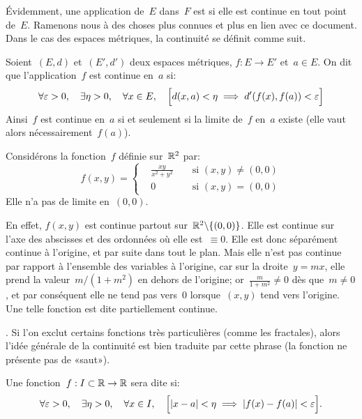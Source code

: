 \medskip
Évidemment, une application de~$E$ dans~$F$ est  si elle est continue en tout point de~$E$.
\medskipvm
Ramenons nous à des choses plus connues et plus en lien avec ce document.
Dans le cas des espaces métriques, la continuité se définit comme suit.

\begin{definition}
Soient~$(E,d)$ et~$(E',d')$ deux espaces métriques, $f: E \to E'$ et~$a \in E$.
On dit que l'application~$f$ est continue en~$a$ si:
\begin{equation}
  \forall \varepsilon > 0, \quad \exists \eta > 0, \quad \forall x \in E, \quad \Bigl[d(x,a)<\eta \implies d'(f(x),f(a))<\varepsilon\Bigr]
\end{equation}
Ainsi~$f$ est continue en~$a$ si et seulement si la limite de~$f$ en~$a$ existe (elle vaut alors nécessairement~$f(a)$).
\end{definition}

\medskip
Considérons la fonction~$f$ définie sur~$\mathbb R^2$ par:
\begin{equation}
  f(x,y)=\left\{\begin{aligned}&\frac{xy}{x^2+y^2}&&\text{ si } (x,y)\neq(0,0) \\
&0&&\text{ si } (x,y)=(0,0) \end{aligned}\right.
\end{equation}
Elle n'a pas de limite en~$(0,0)$.

\small
En effet, $f(x,y)$ est continue partout sur~$\mathbb R^2\backslash\{(0,0)\}$. Elle est continue sur l'axe des abscisses et des ordonnées où elle est~$\equiv0$. Elle est donc séparément continue à l'origine, et par suite dans tout le plan. Mais elle n'est pas continue par rapport à l'ensemble des variables à l'origine, car sur la droite~$y=mx$, elle prend la valeur~$m/(1+m^2)$ en dehors de l'origine; or~$\frac{m}{1+m^2}\ne0$ dès que~$m\ne0$, et par conséquent elle ne tend pas vers~$0$ lorsque~$(x,y)$ tend vers l'origine. Une telle fonction est dite partiellement continue.
\normalsize

\medskip
{}. Si l'on exclut certains fonctions très particulières (comme les fractales), alors l'idée générale de la continuité est bien traduite par cette phrase (la fonction ne présente pas de «saut»).

\medskip
\begin{definition}
Une fonction~$f: I\subset\mathbb R \to \mathbb R$ sera dite  si:
\begin{equation}
  \forall \varepsilon > 0, \quad \exists \eta > 0, \quad \forall x \in I, \quad \Bigl[|x - a| <\eta \implies |f(x) - f(a)|<\varepsilon\Bigr].
\end{equation}
\end{definition}

